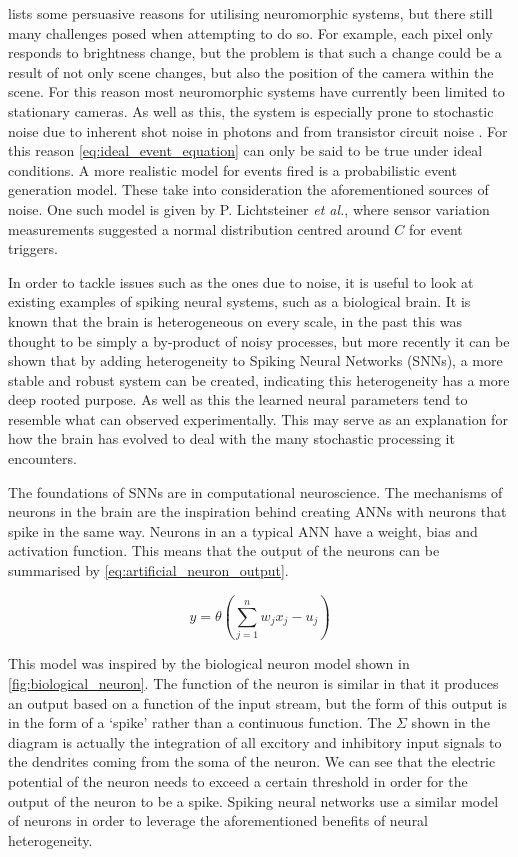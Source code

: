  lists some persuasive reasons for utilising neuromorphic systems, but there still many challenges posed when attempting to do so. For example, each pixel only responds to brightness change, but the problem is that such a change could be a result of not only scene changes, but also the position of the camera within the scene. For this reason most neuromorphic systems have currently been limited to stationary cameras. As well as this, the system is especially prone to stochastic noise due to inherent shot noise in photons and from transistor circuit noise \cite{EventBasedVisionASurvery}. For this reason \cref{eq:ideal_event_equation} can only be said to be true under ideal conditions. A more realistic model for events fired is a probabilistic event generation model. These take into consideration the aforementioned sources of noise. One such model is given by P. Lichtsteiner \textit{et al.}\cite{NonIdealEventCamera}, where sensor variation measurements suggested a normal distribution centred around $ C $ for event triggers.

In order to tackle issues such as the ones due to noise, it is useful to look at existing examples of spiking neural systems, such as a biological brain. It is known that the brain is heterogeneous on every scale, in the past this was thought to be simply a by-product of noisy processes, but more recently it can be shown that by adding heterogeneity to Spiking Neural Networks (SNNs), a more stable and robust system can be created\cite{NeuralHetroPromRobLearn}, indicating this heterogeneity has a more deep rooted purpose. As well as this the learned neural parameters tend to resemble what can observed experimentally. This may serve as an explanation for how the brain has evolved to deal with the many stochastic processing it encounters.

The foundations of SNNs are in computational neuroscience. The mechanisms of neurons in the brain are the inspiration behind creating ANNs with neurons that spike in the same way. Neurons in an a typical ANN have a weight, bias and activation function. This means that the output of the neurons can be summarised by \cref{eq:artificial_neuron_output}.

\begin{equation}
      y = \theta(\sum^n_{j=1}w_jx_j-u_j)
      \label{eq:artificial_neuron_output}
\end{equation}

This model was inspired by the biological neuron model shown in \cref{fig:biological_neuron}. The function of the neuron is similar in that it produces an output based on a function of the input stream, but the form of this output is in the form of a `spike' rather than a continuous function. The $ \Sigma $ shown in the diagram is actually the integration of all excitory and inhibitory input signals to the dendrites coming from the soma of the neuron. We can see that the electric potential of the neuron needs to exceed a certain threshold in order for the output of the neuron to be a spike. Spiking neural networks use a similar model of neurons in order to leverage the aforementioned benefits of neural heterogeneity.

